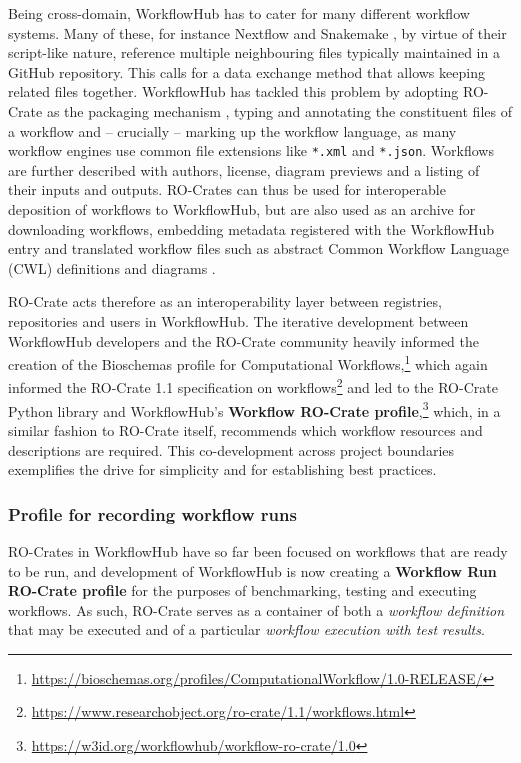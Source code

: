 \documentclass[ds,v1.1.2,openaccess]{iosart2x}%
\begin{document}
Being cross-domain, WorkflowHub has to cater for many different
workflow systems. Many of these, for instance Nextflow
\cite{doi:10.1038/nbt.3820} and Snakemake
\cite{doi:10.1093/bioinformatics/bts480}, by virtue of their script-like
nature, reference multiple neighbouring files typically maintained in a
GitHub repository. This calls for a data exchange method that allows
keeping related files together. WorkflowHub has tackled this problem by
adopting RO-Crate as the packaging mechanism
\cite{doi:10.5281/zenodo.4705078}, typing and annotating the constituent
files of a workflow and -- crucially -- marking up the workflow
language, as many workflow engines use common file extensions like
\texttt{*.xml} and \texttt{*.json}. Workflows are further described with authors,
license, diagram previews and a listing of their inputs and outputs.
RO-Crates can thus be used for interoperable deposition of workflows to
WorkflowHub, but are also used as an archive for downloading workflows,
embedding metadata registered with the WorkflowHub entry and translated
workflow files such as abstract Common Workflow Language (CWL)
\cite{doi:10.1145/3486897} definitions and diagrams \cite{doi:10.5281/zenodo.4605654}.

RO-Crate acts therefore as an interoperability layer between
registries, repositories and users in WorkflowHub. The iterative
development between WorkflowHub developers and the RO-Crate community
heavily informed the creation of the Bioschemas \cite{bioschemas_2017}
profile for Computational
Workflows,\footnote{\url{https://bioschemas.org/profiles/ComputationalWorkflow/1.0-RELEASE/}}
which again informed the RO-Crate 1.1 specification on
workflows\footnote{\url{https://www.researchobject.org/ro-crate/1.1/workflows.html}}
and led to the RO-Crate Python library \cite{ro-crate-py} and WorkflowHub's
\textbf{Workflow RO-Crate
profile},\footnote{\url{https://w3id.org/workflowhub/workflow-ro-crate/1.0}} which,
in a similar fashion to RO-Crate itself, recommends which workflow
resources and descriptions are required. This co-development across
project boundaries exemplifies the drive for simplicity and for
establishing best practices.

\subsubsection{Profile for recording workflow runs}

RO-Crates in WorkflowHub have so far been focused on workflows that are
ready to be run, and development of WorkflowHub is now creating a
\textbf{Workflow Run RO-Crate profile} for the purposes of benchmarking,
testing and executing workflows. As such, RO-Crate serves as a
container of both a \textit{workflow definition} that may be executed and of a
particular \textit{workflow execution with test results}.
\end{document}
